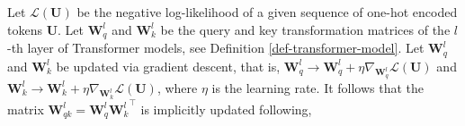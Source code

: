 \begin{remark}
%
Let $\mathcal{L}(\bm{U})$ be the negative log-likelihood of a given sequence of one-hot encoded tokens $\bm{U}$.
%
Let $\bm{W}^l_q$ and $\bm{W}^l_k$ be the query and key transformation matrices of the $l$-th layer of Transformer models, see Definition \ref{def-transformer-model}.
%
Let $\bm{W}^l_q$ and $\bm{W}^l_k$ be updated via gradient descent, that is, $\bm{W}^l_q \rightarrow \bm{W}^l_q +  \eta\nabla_{\bm{W}_q^l} \mathcal{L}(\bm{U})$ and $\bm{W}^l_k \rightarrow \bm{W}^l_k +  \eta\nabla_{\bm{W}_k^l} \mathcal{L}(\bm{U})$, where $\eta$ is the learning rate.
%
It follows that the matrix $\bm{W}_{qk}^l = \bm{W}^l_q{\bm{W}^l_k}^\top$ is implicitly updated following,
%


\end{remark}
